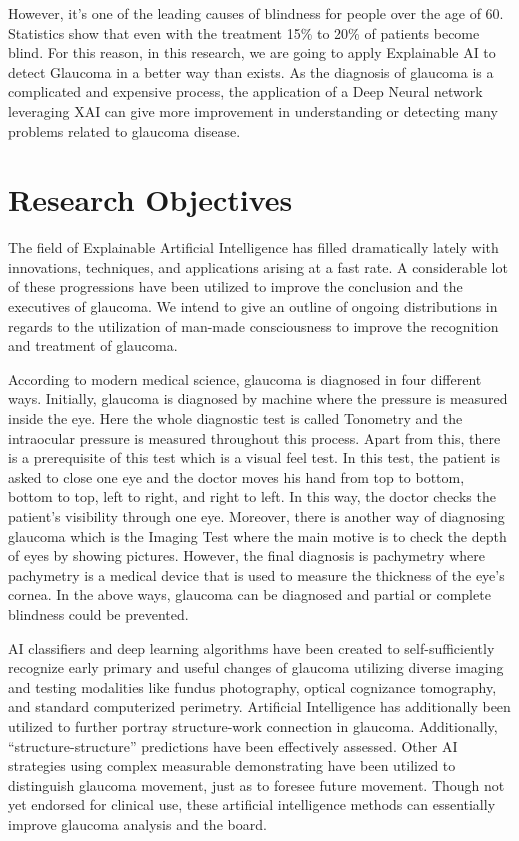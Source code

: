 \vspace{5mm}
However, it's one of the leading causes of blindness for people over the age of 60. Statistics show that even with the treatment 15\% to 20\% of patients become blind. For this reason, in this research, we are going to apply Explainable AI to detect Glaucoma in a better way than exists. As the diagnosis of glaucoma is a complicated and expensive process, the application of a Deep Neural network leveraging XAI can give more improvement in understanding or detecting many problems related to glaucoma disease.

\section{Research Objectives}
The field of Explainable Artificial Intelligence has filled dramatically lately with innovations, techniques, and applications arising at a fast rate. A considerable lot of these progressions have been utilized to improve the conclusion and the executives of glaucoma. We intend to give an outline of ongoing distributions in regards to the utilization of man-made consciousness to improve the recognition and treatment of glaucoma.

\vspace{5mm}
According to modern medical science, glaucoma is diagnosed in four different ways. Initially, glaucoma is diagnosed by machine where the pressure is measured inside the eye. Here the whole diagnostic test is called Tonometry and the intraocular pressure is measured throughout this process. Apart from this, there is a prerequisite of this test which is a visual feel test. In this test, the patient is asked to close one eye and the doctor moves his hand from top to bottom, bottom to top, left to right, and right to left. In this way, the doctor checks the patient’s visibility through one eye. Moreover, there is another way of diagnosing glaucoma which is the Imaging Test where the main motive is to check the depth of eyes by showing pictures. However, the final diagnosis is pachymetry where pachymetry is a medical device that is used to measure the thickness of the eye’s cornea. In the above ways, glaucoma can be diagnosed and partial or complete blindness could be prevented.

\vspace{5mm}
AI classifiers and deep learning algorithms have been created to self-sufficiently recognize early primary and useful changes of glaucoma utilizing diverse imaging and testing modalities like fundus photography, optical cognizance tomography, and standard computerized perimetry. Artificial Intelligence has additionally been utilized to further portray structure-work connection in glaucoma. Additionally, “structure-structure” predictions have been effectively assessed. Other AI strategies using complex measurable demonstrating have been utilized to distinguish glaucoma movement, just as to foresee future movement. Though not yet endorsed for clinical use, these artificial intelligence methods can essentially improve glaucoma analysis and the board.

